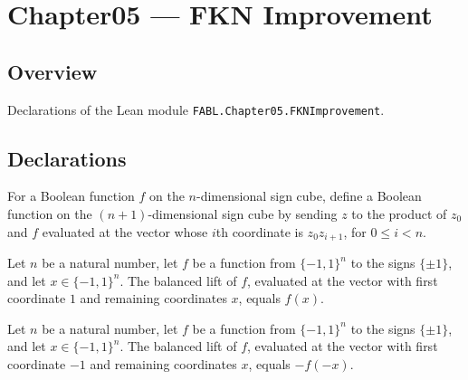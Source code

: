 \chapter{Chapter05 — FKN Improvement}
\section{Overview}

Declarations of the Lean module \texttt{FABL.Chapter05.FKNImprovement}.

\section{Declarations}

\begin{definition}
\label{FABL.balancedFKNLift}
\leanok
{}
For a Boolean function $f$ on the $n$-dimensional sign cube, define a Boolean function
on the $(n+1)$-dimensional sign cube by sending $z$ to the product of $z_0$ and $f$
evaluated at the vector whose $i$th coordinate is $z_0z_{i+1}$, for $0\le i<n$.
\end{definition}

\begin{theorem}
\label{FABL.balancedFKNLift_fin_cons_one}
\leanok
{}
Let $n$ be a natural number, let $f$ be a function from $\{-1,1\}^n$ to the signs
$\{\pm1\}$, and let $x\in\{-1,1\}^n$. The balanced lift of $f$, evaluated at the
vector with first coordinate $1$ and remaining coordinates $x$, equals $f(x)$.
\end{theorem}

\begin{theorem}
\label{FABL.balancedFKNLift_fin_cons_neg_one}
\leanok
{}
Let $n$ be a natural number, let $f$ be a function from $\{-1,1\}^n$ to the signs
$\{\pm1\}$, and let $x\in\{-1,1\}^n$. The balanced lift of $f$, evaluated at the
vector with first coordinate $-1$ and remaining coordinates $x$, equals $-f(-x)$.
\end{theorem}

